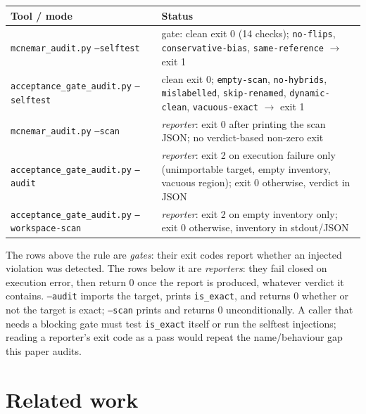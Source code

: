 \documentclass[10pt]{article}
\newcommand{\code}[1]{\texttt{#1}}
\begin{document}
\begin{center}
\small
\begin{tabular}{lp{8.6cm}}
\toprule
Tool / mode & Status \\
\midrule
\code{mcnemar\_audit.py} \code{--selftest} & gate: clean exit 0
(14 checks); \code{no-flips}, \code{conservative-bias},
\code{same-reference} $\to$ exit 1 \\
\code{acceptance\_gate\_audit.py} \code{--selftest} & clean exit 0;
\code{empty-scan}, \code{no-hybrids}, \code{mislabelled},
\code{skip-renamed}, \code{dynamic-clean}, \code{vacuous-exact}
$\to$ exit 1 \\
\midrule
\code{mcnemar\_audit.py} \code{--scan} & \emph{reporter}: exit 0 after printing
the scan JSON; no verdict-based non-zero exit \\
\code{acceptance\_gate\_audit.py} \code{--audit} & \emph{reporter}: exit 2 on
execution failure only (unimportable target, empty inventory, vacuous region);
exit 0 otherwise, verdict in JSON \\
\code{acceptance\_gate\_audit.py} \code{--workspace-scan} & \emph{reporter}:
exit 2 on empty inventory only; exit 0 otherwise, inventory in stdout/JSON \\
\bottomrule
\end{tabular}
\end{center}

\noindent The rows above the rule are \emph{gates}: their exit codes report
whether an injected violation was detected. The rows below it are
\emph{reporters}: they fail closed on execution error, then return 0 once the
report is produced, whatever verdict it contains. \code{--audit} imports the
target, prints \code{is\_exact}, and returns 0 whether or not the target is
exact; \code{--scan} prints and returns 0 unconditionally. A caller that needs
a blocking gate must test \code{is\_exact} itself or run the selftest
injections; reading a reporter's exit code as a pass would repeat the
name/behaviour gap this paper audits.


\section{Related work}\label{sec:related}
\end{document}
